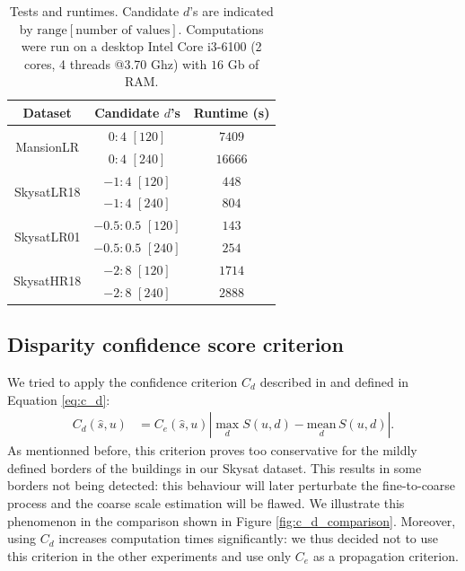 \documentclass{article}
\theoremstyle{definition}
\begin{document}
\begin{table}[ht]
\centering
  \begin{tabular}{|c|c|c|}
   \hline
  \textbf{Dataset} & \textbf{Candidate $d$'s} & \textbf{Runtime (s)}\\
  \hline \hline 
  \multirow{2}{*}{MansionLR} & $0:4$ $[120]$ & $7409$\\
  & $0:4$ $[240]$ & $16666$\\
  \hline 
  \multirow{2}{*}{SkysatLR18} & $-1:4$ $[120]$ & $448$\\
  & $-1:4$ $[240]$ & $804$\\
  \hline 
  \multirow{2}{*}{SkysatLR01} & $-0.5:0.5$ $[120]$ & $143$\\
  & $-0.5:0.5$ $[240]$ & $254$\\
  \hline 
  \multirow{2}{*}{SkysatHR18} & $-2:8$ $[120]$ & $1714$\\
  & $-2:8$ $[240]$ & $2888$\\
  \hline
  \end{tabular}

 \caption{Tests and runtimes. Candidate $d$'s are indicated by $\mathrm{range}[\text{number of values}]$. Computations were run on a desktop Intel Core i3-6100 (2 cores, 4 threads @3.70 Ghz) with $16$ Gb of RAM.}
 \label{table:tests}
\end{table}


\subsection{Disparity confidence score criterion}


We tried to apply the confidence criterion $C_d$ described in \cite{art:kim13:lfields} and defined in Equation \eqref{eq:c_d}:
\begin{align*}
 C_d (\widehat{s}, u) &= C_e (\widehat{s}, u) \left|\max_d S(u, d) - \underset{d}{\mathrm{mean}}\, S(u, d)\right|.
\end{align*}
As mentionned before, this criterion proves too conservative for the mildly defined borders of the buildings in our Skysat dataset. This results in some borders not being detected: this behaviour will later perturbate the fine-to-coarse process and the coarse scale estimation will be flawed. We illustrate this phenomenon in the comparison shown in Figure \ref{fig:c_d_comparison}. Moreover, using $C_d$ increases computation times significantly: we thus decided not to use this criterion in the other experiments and use only $C_e$ as a propagation criterion.
\end{document}
